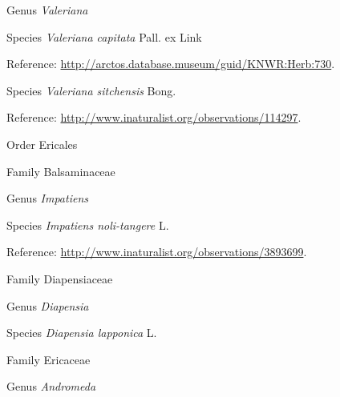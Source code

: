 \documentclass[9pt, article]{memoir}
\begin{document}
\begin{multicols}{2}
\vspace{6pt}\noindent\hspace{30pt}Genus \textit{Valeriana}


\vspace{6pt}\noindent\hspace{36pt}Species \textit{Valeriana capitata} Pall. ex Link


\vspace{6pt}Reference: 
\url{http://arctos.database.museum/guid/KNWR:Herb:730}.

\vspace{6pt}\noindent\hspace{36pt}Species \textit{Valeriana sitchensis} Bong.


\vspace{6pt}Reference: 
\url{http://www.inaturalist.org/observations/114297}.

\vspace{6pt}\noindent\hspace{18pt}Order Ericales


\vspace{6pt}\noindent\hspace{24pt}Family Balsaminaceae


\vspace{6pt}\noindent\hspace{30pt}Genus \textit{Impatiens}


\vspace{6pt}\noindent\hspace{36pt}Species \textit{Impatiens noli-tangere} L.


\vspace{6pt}Reference: 
\url{http://www.inaturalist.org/observations/3893699}.

\vspace{6pt}\noindent\hspace{24pt}Family Diapensiaceae


\vspace{6pt}\noindent\hspace{30pt}Genus \textit{Diapensia}


\vspace{6pt}\noindent\hspace{36pt}Species \textit{Diapensia lapponica} L.


\vspace{6pt}\noindent\hspace{24pt}Family Ericaceae


\vspace{6pt}\noindent\hspace{30pt}Genus \textit{Andromeda}



\end{multicols}
\end{document}
